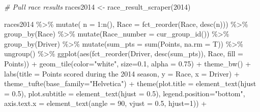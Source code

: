 \documentclass[
]{book}
\newenvironment{Shaded}{\begin{snugshade}}{\end{snugshade}}
\newcommand{\AttributeTok}[1]{\textcolor[rgb]{0.77,0.63,0.00}{#1}}
\newcommand{\CommentTok}[1]{\textcolor[rgb]{0.56,0.35,0.01}{\textit{#1}}}
\newcommand{\DecValTok}[1]{\textcolor[rgb]{0.00,0.00,0.81}{#1}}
\newcommand{\FloatTok}[1]{\textcolor[rgb]{0.00,0.00,0.81}{#1}}
\newcommand{\FunctionTok}[1]{\textcolor[rgb]{0.00,0.00,0.00}{#1}}
\newcommand{\NormalTok}[1]{#1}
\newcommand{\OtherTok}[1]{\textcolor[rgb]{0.56,0.35,0.01}{#1}}
\newcommand{\SpecialCharTok}[1]{\textcolor[rgb]{0.00,0.00,0.00}{#1}}
\newcommand{\StringTok}[1]{\textcolor[rgb]{0.31,0.60,0.02}{#1}}
\begin{document}
\begin{Shaded}
\begin{Highlighting}[]
\CommentTok{\# Pull race results}
\NormalTok{races2014 }\OtherTok{\textless{}{-}} \FunctionTok{race\_result\_scraper}\NormalTok{(}\DecValTok{2014}\NormalTok{)}

\NormalTok{races2014 }\SpecialCharTok{\%\textgreater{}\%}
  \FunctionTok{mutate}\NormalTok{( }\AttributeTok{n =} \DecValTok{1}\SpecialCharTok{:}\FunctionTok{n}\NormalTok{(),}
          \AttributeTok{Race =} \FunctionTok{fct\_reorder}\NormalTok{(Race, }\FunctionTok{desc}\NormalTok{(n))) }\SpecialCharTok{\%\textgreater{}\%}
  \FunctionTok{group\_by}\NormalTok{(Race) }\SpecialCharTok{\%\textgreater{}\%} 
  \FunctionTok{mutate}\NormalTok{(}\AttributeTok{Race\_number =} \FunctionTok{cur\_group\_id}\NormalTok{()) }\SpecialCharTok{\%\textgreater{}\%}
  \FunctionTok{group\_by}\NormalTok{(Driver) }\SpecialCharTok{\%\textgreater{}\%} 
  \FunctionTok{mutate}\NormalTok{(}\AttributeTok{sum\_pts =} \FunctionTok{sum}\NormalTok{(Points, }\AttributeTok{na.rm =}\NormalTok{ T)) }\SpecialCharTok{\%\textgreater{}\%}
  \FunctionTok{ungroup}\NormalTok{() }\SpecialCharTok{\%\textgreater{}\%} 
  \FunctionTok{ggplot}\NormalTok{(}\FunctionTok{aes}\NormalTok{(}\FunctionTok{fct\_reorder}\NormalTok{(Driver, }\FunctionTok{desc}\NormalTok{(sum\_pts)), Race, }\AttributeTok{fill =}\NormalTok{ Points)) }\SpecialCharTok{+}
  \FunctionTok{geom\_tile}\NormalTok{(}\AttributeTok{color=}\StringTok{"white"}\NormalTok{, }\AttributeTok{size=}\FloatTok{0.1}\NormalTok{, }\AttributeTok{alpha =} \FloatTok{0.75}\NormalTok{) }\SpecialCharTok{+}
  \FunctionTok{theme\_bw}\NormalTok{() }\SpecialCharTok{+}
  \FunctionTok{labs}\NormalTok{(}\AttributeTok{title =} \StringTok{\textquotesingle{}Points scored during the 2014 season\textquotesingle{}}\NormalTok{,}
       \AttributeTok{y =} \StringTok{\textquotesingle{}Race\textquotesingle{}}\NormalTok{,}
       \AttributeTok{x =} \StringTok{\textquotesingle{}Driver\textquotesingle{}}\NormalTok{) }\SpecialCharTok{+} 
  \FunctionTok{theme\_tufte}\NormalTok{(}\AttributeTok{base\_family=}\StringTok{"Helvetica"}\NormalTok{)  }\SpecialCharTok{+}
  \FunctionTok{theme}\NormalTok{(}\AttributeTok{plot.title =} \FunctionTok{element\_text}\NormalTok{(}\AttributeTok{hjust =} \FloatTok{0.5}\NormalTok{),}
        \AttributeTok{plot.subtitle =} \FunctionTok{element\_text}\NormalTok{(}\AttributeTok{hjust =} \FloatTok{0.5}\NormalTok{),}
        \AttributeTok{legend.position=}\StringTok{"bottom"}\NormalTok{,}
        \AttributeTok{axis.text.x =} \FunctionTok{element\_text}\NormalTok{(}\AttributeTok{angle =} \DecValTok{90}\NormalTok{, }\AttributeTok{vjust =} \FloatTok{0.5}\NormalTok{, }\AttributeTok{hjust=}\DecValTok{1}\NormalTok{)) }\SpecialCharTok{+}

\end{Highlighting}
\end{Shaded}
\end{document}
